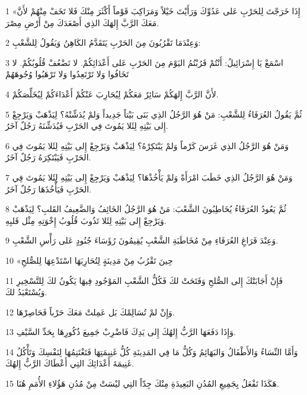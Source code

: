 \par 1 «إِذَا خَرَجْتَ لِلحَرْبِ عَلى عَدُوِّكَ وَرَأَيْتَ خَيْلاً وَمَرَاكِبَ قَوْماً أَكْثَرَ مِنْكَ فَلا تَخَفْ مِنْهُمْ لأَنَّ مَعَكَ الرَّبَّ إِلهَكَ الذِي أَصْعَدَكَ مِنْ أَرْضِ مِصْرَ.
\par 2 وَعِنْدَمَا تَقْرُبُونَ مِنَ الحَرْبِ يَتَقَدَّمُ الكَاهِنُ وَيَقُولُ لِلشَّعْبِ:
\par 3 اسْمَعْ يَا إِسْرَائِيلُ: أَنْتُمْ قَرُبْتُمُ اليَوْمَ مِنَ الحَرْبِ عَلى أَعْدَائِكُمْ. لا تَضْعُفْ قُلُوبُكُمْ. لا تَخَافُوا وَلا تَرْتَعِدُوا وَلا تَرْهَبُوا وُجُوهَهُمْ
\par 4 لأَنَّ الرَّبَّ إِلهَكُمْ سَائِرٌ مَعَكُمْ لِيُحَارِبَ عَنْكُمْ أَعْدَاءَكُمْ لِيُخَلِّصَكُمْ.
\par 5 ثُمَّ يَقُولُ العُرَفَاءُ لِلشَّعْبِ: مَنْ هُوَ الرَّجُلُ الذِي بَنَى بَيْتاً جَدِيداً وَلمْ يُدَشِّنْهُ؟ لِيَذْهَبْ وَيَرْجِعْ إِلى بَيْتِهِ لِئَلا يَمُوتَ فِي الحَرْبِ فَيُدَشِّنَهُ رَجُلٌ آخَرُ.
\par 6 وَمَنْ هُوَ الرَّجُلُ الذِي غَرَسَ كَرْماً وَلمْ يَبْتَكِرْهُ؟ لِيَذْهَبْ وَيَرْجِعْ إِلى بَيْتِهِ لِئَلا يَمُوتَ فِي الحَرْبِ فَيَبْتَكِرَهُ رَجُلٌ آخَرُ.
\par 7 وَمَنْ هُوَ الرَّجُلُ الذِي خَطَبَ امْرَأَةً وَلمْ يَأْخُذْهَا؟ لِيَذْهَبْ وَيَرْجِعْ إِلى بَيْتِهِ لِئَلا يَمُوتَ فِي الحَرْبِ فَيَأْخُذَهَا رَجُلٌ آخَرُ.
\par 8 ثُمَّ يَعُودُ العُرَفَاءُ يُخَاطِبُونَ الشَّعْبَ: مَنْ هُوَ الرَّجُلُ الخَائِفُ وَالضَّعِيفُ القَلبِ؟ لِيَذْهَبْ وَيَرْجِعْ إِلى بَيْتِهِ لِئَلا تَذُوبَ قُلُوبُ إِخْوَتِهِ مِثْل قَلبِهِ.
\par 9 وَعِنْدَ فَرَاغِ العُرَفَاءِ مِنْ مُخَاطَبَةِ الشَّعْبِ يُقِيمُونَ رُؤَسَاءَ جُنُودٍ عَلى رَأْسِ الشَّعْبِ.
\par 10 «حِينَ تَقْرُبُ مِنْ مَدِينَةٍ لِتُحَارِبَهَا اسْتَدْعِهَا لِلصُّلحِ
\par 11 فَإِنْ أَجَابَتْكَ إِلى الصُّلحِ وَفَتَحَتْ لكَ فَكُلُّ الشَّعْبِ المَوْجُودِ فِيهَا يَكُونُ لكَ لِلتَّسْخِيرِ وَيُسْتَعْبَدُ لكَ.
\par 12 وَإِنْ لمْ تُسَالِمْكَ بَل عَمِلتْ مَعَكَ حَرْباً فَحَاصِرْهَا.
\par 13 وَإِذَا دَفَعَهَا الرَّبُّ إِلهُكَ إِلى يَدِكَ فَاضْرِبْ جَمِيعَ ذُكُورِهَا بِحَدِّ السَّيْفِ.
\par 14 وَأَمَّا النِّسَاءُ وَالأَطْفَالُ وَالبَهَائِمُ وَكُلُّ مَا فِي المَدِينَةِ كُلُّ غَنِيمَتِهَا فَتَغْتَنِمُهَا لِنَفْسِكَ وَتَأْكُلُ غَنِيمَةَ أَعْدَائِكَ التِي أَعْطَاكَ الرَّبُّ إِلهُكَ.
\par 15 هَكَذَا تَفْعَلُ بِجَمِيعِ المُدُنِ البَعِيدَةِ مِنْكَ جِدّاً التِي ليْسَتْ مِنْ مُدُنِ هَؤُلاءِ الأُمَمِ هُنَا.
